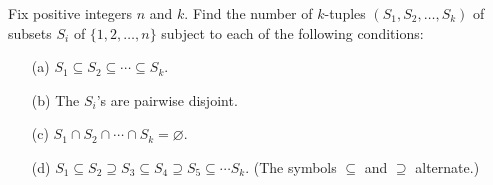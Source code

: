 Fix positive integers $n$ and $k$. Find the number of $k$-tuples $(S_1, S_2, \dots, S_k)$ of subsets $S_i$ of $\{1, 2, \dots , n\}$ subject to each of the following conditions:

\begin{enumerate}
	\item[(a)] $S_1 \subseteq S_2 \subseteq \cdots \subseteq S_k$.
	\item[(b)] The $S_i$'s are pairwise disjoint.
	\item[(c)] $S_1 ∩ S_2 ∩ \cdots ∩ S_k = \varnothing$.
	\item[(d)] $S_1 \subseteq S_2 \supseteq S_3 \subseteq S_4 \supseteq S_5 \subseteq \cdots S_k$. (The symbols $\subseteq$ and $\supseteq$ alternate.)
\end{enumerate}
